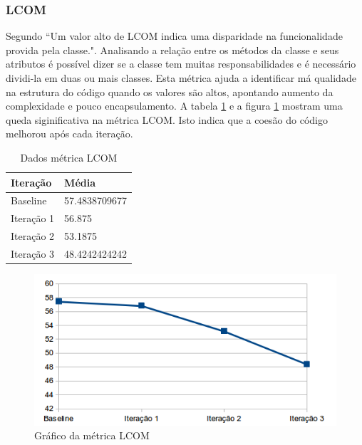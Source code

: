 \documentclass[conference]{IEEEtran}
\begin{document}
\subsubsection{LCOM}

Segundo  ``Um valor alto de LCOM indica uma disparidade na
funcionalidade provida pela classe.". Analisando a relação entre os métodos da
classe e seus atributos é possível dizer se a classe tem muitas
responsabilidades e é necessário dividi-la em duas ou mais classes. Esta métrica
ajuda a identificar má qualidade na estrutura do código quando os valores são
altos, apontando aumento da complexidade e pouco encapsulamento. A tabela
\ref{tab:lcom} e a figura \ref{fig:lcom} mostram uma queda siginificativa na
métrica LCOM. Isto indica que a coesão do código melhorou após cada iteração.

\begin{table}[!h]
	\centering
	    \caption{\label{tab:lcom} Dados métrica LCOM}
    \begin{tabular}{ | l | l | }
    \hline
    Iteração & Média 			\\ \hline
    Baseline & 57.4838709677   	\\ \hline
    Iteração 1 & 56.875			\\ \hline
	Iteração 2 & 53.1875		\\ \hline
	Iteração 3 & 48.4242424242	\\ \hline
    \end{tabular}
    
\end{table}

\begin{figure}[!htb]
	\begin{center}
		\includegraphics[scale=0.7]{img/lcom.png}
	\end{center}
	\caption{\label{fig:lcom} Gráfico da métrica LCOM}   
	
\end{figure}
\end{document}
